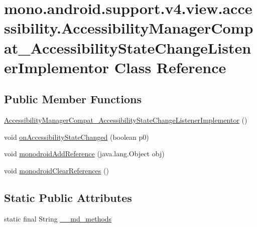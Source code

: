 \hypertarget{classmono_1_1android_1_1support_1_1v4_1_1view_1_1accessibility_1_1_accessibility_manager_compat_18265d54b1862e339153b0dd9ae68d99}{
\section{mono.android.support.v4.view.accessibility.AccessibilityManagerCompat\_\-AccessibilityStateChangeListenerImplementor Class Reference}
\label{classmono_1_1android_1_1support_1_1v4_1_1view_1_1accessibility_1_1_accessibility_manager_compat_18265d54b1862e339153b0dd9ae68d99}
}
\subsection*{Public Member Functions}
\begin{CompactItemize}
\item 
\hyperlink{classmono_1_1android_1_1support_1_1v4_1_1view_1_1accessibility_1_1_accessibility_manager_compat_18265d54b1862e339153b0dd9ae68d99_5eb885304d820caca8bdead31549e697}{AccessibilityManagerCompat\_\-AccessibilityStateChangeListenerImplementor} ()
\item 
void \hyperlink{classmono_1_1android_1_1support_1_1v4_1_1view_1_1accessibility_1_1_accessibility_manager_compat_18265d54b1862e339153b0dd9ae68d99_cdf8570d96d322e71494739706e3af96}{onAccessibilityStateChanged} (boolean p0)
\item 
void \hyperlink{classmono_1_1android_1_1support_1_1v4_1_1view_1_1accessibility_1_1_accessibility_manager_compat_18265d54b1862e339153b0dd9ae68d99_5616ac43fada2020fb225da3e2755d8e}{monodroidAddReference} (java.lang.Object obj)
\item 
void \hyperlink{classmono_1_1android_1_1support_1_1v4_1_1view_1_1accessibility_1_1_accessibility_manager_compat_18265d54b1862e339153b0dd9ae68d99_e0bd329d8a6fcfcf3820b81f03775c17}{monodroidClearReferences} ()
\end{CompactItemize}
\subsection*{Static Public Attributes}
\begin{CompactItemize}
\item 
static final String \hyperlink{classmono_1_1android_1_1support_1_1v4_1_1view_1_1accessibility_1_1_accessibility_manager_compat_18265d54b1862e339153b0dd9ae68d99_f97918afc32f2d74733ff3d398f908c0}{\_\-\_\-md\_\-methods}
\end{CompactItemize}
